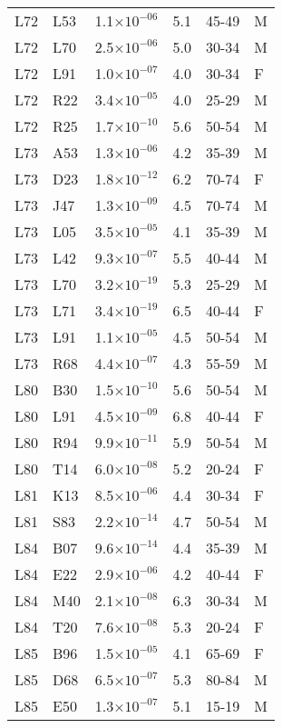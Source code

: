 \begin{longtable}{lllrll}
   L72 & L53 & 1.1$\times10^{-06}$ & 5.1 & 45-49 & M \\ 
   L72 & L70 & 2.5$\times10^{-06}$ & 5.0 & 30-34 & M \\ 
   L72 & L91 & 1.0$\times10^{-07}$ & 4.0 & 30-34 & F \\ 
   L72 & R22 & 3.4$\times10^{-05}$ & 4.0 & 25-29 & M \\ 
   L72 & R25 & 1.7$\times10^{-10}$ & 5.6 & 50-54 & M \\ 
   L73 & A53 & 1.3$\times10^{-06}$ & 4.2 & 35-39 & M \\ 
   L73 & D23 & 1.8$\times10^{-12}$ & 6.2 & 70-74 & F \\ 
   L73 & J47 & 1.3$\times10^{-09}$ & 4.5 & 70-74 & M \\ 
   L73 & L05 & 3.5$\times10^{-05}$ & 4.1 & 35-39 & M \\ 
   L73 & L42 & 9.3$\times10^{-07}$ & 5.5 & 40-44 & M \\ 
   L73 & L70 & 3.2$\times10^{-19}$ & 5.3 & 25-29 & M \\ 
   L73 & L71 & 3.4$\times10^{-19}$ & 6.5 & 40-44 & F \\ 
   L73 & L91 & 1.1$\times10^{-05}$ & 4.5 & 50-54 & M \\ 
   L73 & R68 & 4.4$\times10^{-07}$ & 4.3 & 55-59 & M \\ 
   L80 & B30 & 1.5$\times10^{-10}$ & 5.6 & 50-54 & M \\ 
   L80 & L91 & 4.5$\times10^{-09}$ & 6.8 & 40-44 & F \\ 
   L80 & R94 & 9.9$\times10^{-11}$ & 5.9 & 50-54 & M \\ 
   L80 & T14 & 6.0$\times10^{-08}$ & 5.2 & 20-24 & F \\ 
   L81 & K13 & 8.5$\times10^{-06}$ & 4.4 & 30-34 & F \\ 
   L81 & S83 & 2.2$\times10^{-14}$ & 4.7 & 50-54 & M \\ 
   L84 & B07 & 9.6$\times10^{-14}$ & 4.4 & 35-39 & M \\ 
   L84 & E22 & 2.9$\times10^{-06}$ & 4.2 & 40-44 & F \\ 
   L84 & M40 & 2.1$\times10^{-08}$ & 6.3 & 30-34 & M \\ 
   L84 & T20 & 7.6$\times10^{-08}$ & 5.3 & 20-24 & F \\ 
   L85 & B96 & 1.5$\times10^{-05}$ & 4.1 & 65-69 & F \\ 
   L85 & D68 & 6.5$\times10^{-07}$ & 5.3 & 80-84 & M \\ 
   L85 & E50 & 1.3$\times10^{-07}$ & 5.1 & 15-19 & M \\ 

\end{longtable}
